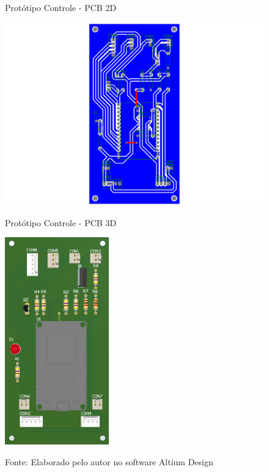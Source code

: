 \documentclass[../delivery_hospital_report.tex]{subfiles}
\begin{document}
\begin{figure}[h]
    \centering
    \begin{minipage}{0.5\textwidth}
        \centering
        \caption{Protótipo Controle - PCB 2D}
        \includegraphics[width=1.03\textwidth]{modulos/Controle_Motor-2.png} 
        \label{fig:figura1minipg}
    \end{minipage}\hfill
    \begin{minipage}{0.5\textwidth}
        \centering
        \caption{Protótipo Controle - PCB 3D }
        \includegraphics[width=0.4\textwidth]{modulos/Controle_Motor.png} 
        \label{fig:figura1minipg}
    \end{minipage}\hfill
    
    \caption*{Fonte: Elaborado pelo autor no software Altium Design\cite{altium21} }
    \label{fig:2d3dcontrolepro}
\end{figure}
\end{document}
